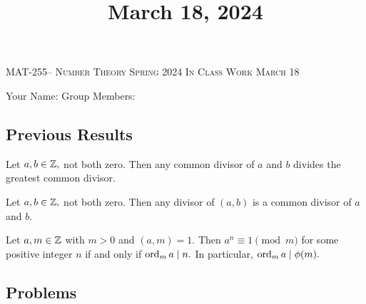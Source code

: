 \documentclass[handout]{ximera}
\title{March 18, 2024}
\begin{document}
\handoutAbstract
\maketitle
 	\begin{center}%
    		{\large \scshape MAT-255-- Number Theory 
			\hfill Spring 2024 
			\hfill In Class Work March 18}%
    
		{\large Your Name: \hrulefill \quad 
			Group Members:\hrulefill \quad 
			\hrulefill
			\par}%
 	\end{center}%
	
 \subsection*{Previous Results}
 \begin{lemma}\label{lem:gcd_mult}
	Let $a,b\in\mathbb Z,$ not both zero. Then any  common divisor of $a$ and $b$ divides the greatest common divisor.
\end{lemma}


\begin{lemma}\label{lem:gcd_trans}
 	Let $a,b\in\mathbb Z,$ not both zero. Then any divisor of $(a,b)$ is a common divisor of $a$ and $b$.
\end{lemma}
 
 \begin{prop*}[Proposition 5.1]\label{prop:order_divides_phi}
    Let $a,m\in\mathbb Z$ with $m>0$ and $(a,m)=1.$ Then $a^n\equiv 1\pmod{m}$ for some positive integer $n$ if and only if $\operatorname{ord}_m a\mid n.$ In particular, $\operatorname{ord}_m a\mid \phi(m).$
\end{prop*}

\subsection*{Problems}
\end{document}
